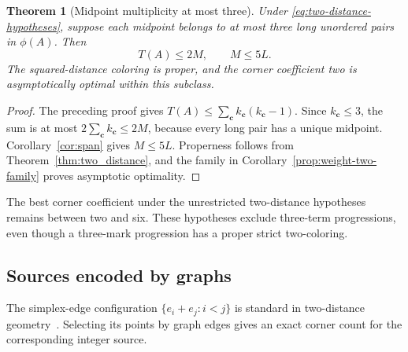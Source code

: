 \documentclass[11pt,a4paper]{article}
\newtheorem{theorem}{Theorem}[section]
\theoremstyle{definition}
\numberwithin{equation}{section}
\begin{document}
\begin{theorem}[Midpoint multiplicity at most three]\label{thm:midpoint-three}
Under \eqref{eq:two-distance-hypotheses}, suppose each midpoint belongs to at most three long unordered pairs in $\phi(A)$. Then
\begin{equation}\label{eq:midpoint-three-bounds}
T(A)\le2M,\qquad M\le5L.
\end{equation}
The squared-distance coloring is proper, and the corner coefficient two is asymptotically optimal within this subclass.
\end{theorem}
\begin{proof}
The preceding proof gives $T(A)\le\sum_{\mathbf c}k_{\mathbf c}(k_{\mathbf c}-1)$. Since $k_{\mathbf c}\le3$, the sum is at most $2\sum_{\mathbf c}k_{\mathbf c}\le2M$, because every long pair has a unique midpoint. Corollary~\ref{cor:span} gives $M\le5L$. Properness follows from Theorem~\ref{thm:two_distance}, and the family in Corollary~\ref{prop:weight-two-family} proves asymptotic optimality.
\end{proof}
The best corner coefficient under the unrestricted two-distance hypotheses remains between two and six. These hypotheses exclude three-term progressions, even though a three-mark progression has a proper strict two-coloring.

\subsection{Sources encoded by graphs}
The simplex-edge configuration $\{e_i+e_j:i<j\}$ is standard in two-distance geometry~\cite{Musin09,BSS12}. Selecting its points by graph edges gives an exact corner count for the corresponding integer source.
\end{document}

